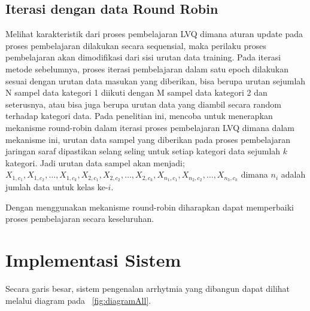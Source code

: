 \subsection{Iterasi dengan data Round Robin}
\label{ssec:round-robin}
Melihat karakteristik dari proses pembelajaran LVQ dimana aturan update pada
proses pembelajaran dilakukan secara sequensial, maka perilaku proses
pembelajaran akan dimodifikasi dari sisi urutan data training. Pada iterasi metode sebelumnya,
proses iterasi pembelajaran dalam satu epoch dilakukan sesuai  dengan urutan
data masukan yang diberikan, bisa berupa urutan sejumlah N sampel data kategori
1 diikuti dengan  M sampel data kategori 2 dan seterusnya, atau bisa juga berupa
urutan data yang diambil secara random terhadap kategori data. Pada penelitian ini, \saya
mencoba untuk menerapkan mekanisme round-robin dalam iterasi proses pembelajaran
LVQ dimana dalam mekanisme ini, urutan data sampel yang diberikan pada proses
pembelajaran jaringan saraf dipastikan selang seling untuk setiap kategori data
sejumlah $k$ kategori. Jadi urutan data sampel akan menjadi; $X_{1,c_1},
X_{1,c_2}, \dots, X_{1,c_k}, X_{2,c_1}, X_{2,c_2}, \dots, X_{2,c_k},
X_{n_1,c_1},X_{n_2,c_2}, \dots,X_{n_3,c_k}$ dimana $n_i$ adalah jumlah data
untuk kelas ke-$i$.

Dengan menggunakan mekanisme round-robin diharapkan dapat memperbaiki proses
pembelajaran secara keseluruhan.


% 

\section{Implementasi Sistem}
Secara garis besar, sistem pengenalan arrhytmia yang dibangun dapat dilihat
melalui diagram pada \pic~\ref{fig:diagramAll}. 

